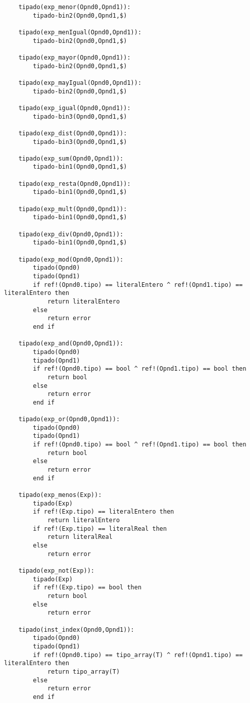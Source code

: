 \begin{lstlisting}
    tipado(exp_menor(Opnd0,Opnd1)):
        tipado-bin2(Opnd0,Opnd1,$)

    tipado(exp_menIgual(Opnd0,Opnd1)):
        tipado-bin2(Opnd0,Opnd1,$)

    tipado(exp_mayor(Opnd0,Opnd1)):
        tipado-bin2(Opnd0,Opnd1,$)

    tipado(exp_mayIgual(Opnd0,Opnd1)):
        tipado-bin2(Opnd0,Opnd1,$)

    tipado(exp_igual(Opnd0,Opnd1)):
        tipado-bin3(Opnd0,Opnd1,$)

    tipado(exp_dist(Opnd0,Opnd1)):
        tipado-bin3(Opnd0,Opnd1,$)

    tipado(exp_sum(Opnd0,Opnd1)):
        tipado-bin1(Opnd0,Opnd1,$)

    tipado(exp_resta(Opnd0,Opnd1)):
        tipado-bin1(Opnd0,Opnd1,$)

    tipado(exp_mult(Opnd0,Opnd1)):
        tipado-bin1(Opnd0,Opnd1,$)

    tipado(exp_div(Opnd0,Opnd1)):
        tipado-bin1(Opnd0,Opnd1,$)

    tipado(exp_mod(Opnd0,Opnd1)):
        tipado(Opnd0)
        tipado(Opnd1)
        if ref!(Opnd0.tipo) == literalEntero ^ ref!(Opnd1.tipo) == literalEntero then
            return literalEntero
        else 
            return error
        end if

    tipado(exp_and(Opnd0,Opnd1)):
        tipado(Opnd0)
        tipado(Opnd1)
        if ref!(Opnd0.tipo) == bool ^ ref!(Opnd1.tipo) == bool then
            return bool
        else 
            return error
        end if

    tipado(exp_or(Opnd0,Opnd1)):
        tipado(Opnd0)
        tipado(Opnd1)
        if ref!(Opnd0.tipo) == bool ^ ref!(Opnd1.tipo) == bool then
            return bool
        else 
            return error
        end if

    tipado(exp_menos(Exp)):
        tipado(Exp)
        if ref!(Exp.tipo) == literalEntero then
            return literalEntero
        if ref!(Exp.tipo) == literalReal then
            return literalReal
        else 
            return error

    tipado(exp_not(Exp)):
        tipado(Exp)
        if ref!(Exp.tipo) == bool then
            return bool
        else 
            return error

    tipado(inst_index(Opnd0,Opnd1)):
        tipado(Opnd0)
        tipado(Opnd1)
        if ref!(Opnd0.tipo) == tipo_array(T) ^ ref!(Opnd1.tipo) == literalEntero then
            return tipo_array(T)
        else 
            return error
        end if


\end{lstlisting}
